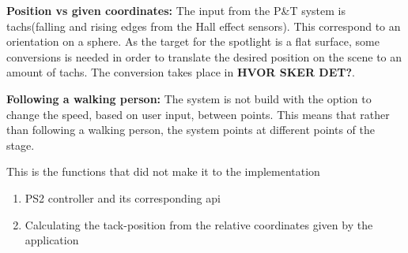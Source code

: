 \textbf{Position vs given coordinates:} The input from the P\&T system is tachs(falling and rising edges from the Hall effect sensors). This correspond to an orientation on a sphere. As the target for the spotlight is a flat surface, some conversions is needed in order to translate the desired position on the scene to an amount of tachs. The conversion takes place in \textbf{HVOR SKER DET?}.


\textbf{Following a walking person:} The system is not build with the option to change the speed, based on user input, between points. This means that rather than following a walking person, the system points at different points of the stage.


This is the functions that did not make it to the implementation

\begin{enumerate}[noitemsep]
	
	\item PS2 controller and its corresponding api
	
	\item Calculating the tack-position from the relative coordinates given by the application  
	
	

\end{enumerate}